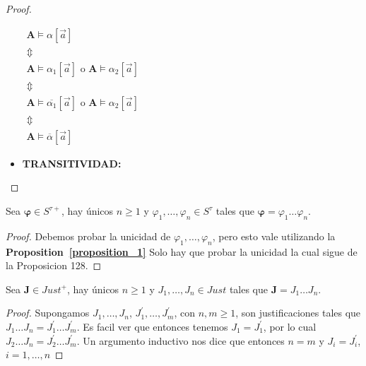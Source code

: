 \begin{proof}
\begin{itemize}
      $\displaystyle \begin{array}{c} \mathbf{A}\models \alpha \left\lbrack \vec{a}\right\rbrack \\ \Updownarrow \\ \mathbf{A}\models \alpha _{1}\left\lbrack \vec{a}\right\rbrack \text{ o }\mathbf{A} \models \alpha _{2}\left\lbrack \vec{a}\right\rbrack \\ \Updownarrow \\ \mathbf{A}\models \overline{\alpha _{1}}\left\lbrack \vec{a}\right\rbrack \text{ o } \mathbf{A}\models \alpha _{2}\left\lbrack \vec{a}\right\rbrack \\ \Updownarrow \\ \mathbf{A}\models \overline{\alpha }\left\lbrack \vec{a}\right\rbrack \end{array} $

      \item \textbf{TRANSITIVIDAD:}
    \end{itemize}
  \end{proof}

  \begin{lemma}
    \PN Sea $\pmb{\varphi} \in S^{\tau +}$, hay únicos $n \geq 1$ y $\varphi_{1}, \dotsc, \varphi_{n} \in S^{\tau}$
    tales que $\pmb{\varphi} = \varphi_{1} \dotsc \varphi_{n}$.
  \end{lemma}
  \begin{proof}
    \PN Debemos probar la unicidad de $\varphi_{1}, \dotsc, \varphi_{n}$, pero esto vale utilizando la
    \textbf{Proposition~\ref{proposition_1}} Solo hay que probar la unicidad la cual sigue de la Proposicion 128.
  \end{proof}

  \begin{lemma}
    \PN Sea $\mathbf{J} \in Just^{+}$, hay únicos $n \geq 1$ y $J_{1}, \dotsc, J_{n} \in Just$ tales que $\mathbf{J} =
    J_{1} \dotsc J_{n}$.
  \end{lemma}
  \begin{proof}
    \PN Supongamos $J_{1}, \dotsc, J_{n}$, $J_{1}^{\prime}, \dotsc, J_{m}^{\prime}$, con $ n,m\geq 1$, son
    justificaciones tales que $J_{1}\dotsc J_{n}=J_{1}^{\prime}\dotsc J_{m}^{\prime}$. Es facil ver que entonces tenemos
    $J_{1}=J_{1}^{\prime}$, por lo cual $J_{2}\dotsc J_{n}=J_{2}^{\prime}\dotsc J_{m}^{\prime}$. Un argumento inductivo
    nos dice que entonces $n=m$ y $J_{i}=J_{i}^{\prime}$, $ i=1, \dotsc, n$
  \end{proof}

